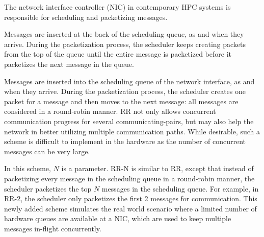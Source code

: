 
The network interface controller (NIC) in contemporary HPC systems is
responsible for scheduling and packetizing messages.

\vspace{0.08in}
Messages are inserted
at the back of the scheduling queue, as and when they arrive.
During the packetization process, %
the scheduler keeps creating packets from the top of the queue until
the entire message is packetized before it packetizes the next message in the queue. 

\vspace{0.08in}
 Messages are inserted into the scheduling queue of
the network interface, as and when they arrive. During the packetization process,
the scheduler creates one packet for a message and then moves to the next message:
all messages are considered in a round-robin manner. 
RR not only allows concurrent communication
progress for several communicating-pairs, but may also help the network in
better utilizing multiple communication paths. While desirable, such a scheme is
difficult to implement in the hardware as the number of concurrent messages can
be very large.

\vspace{0.08in}

\vspace{0.08in}
 In this scheme, $N$ is a parameter. RR-N is similar to RR,
except that instead of packetizing every message in the scheduling queue in
a round-robin manner,
the scheduler packetizes the top $N$ messages in the scheduling queue. For example,
in RR-2, the scheduler only packetizes the first 2 messages for communication.
This newly added scheme simulates the real world scenario where a limited
number of hardware queues are available at a NIC, which are used to keep
multiple messages in-flight concurrently.

